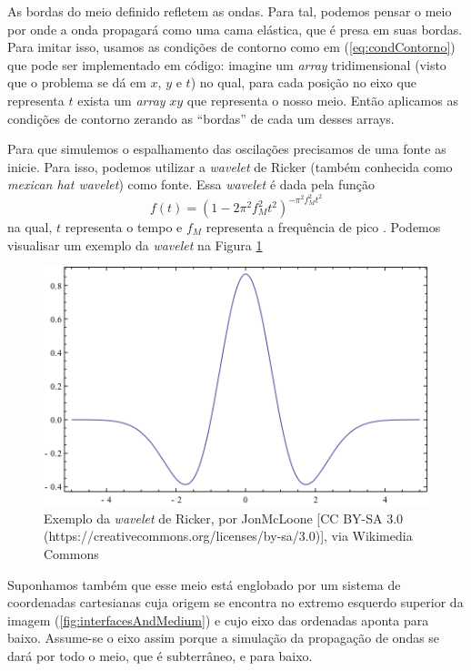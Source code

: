             As bordas do meio definido refletem as ondas. Para tal, podemos pensar o meio por onde a onda propagará como uma
            cama elástica, que é presa em suas bordas. Para imitar isso, usamos as condições de contorno como em (\ref{eq:condContorno})
            que pode ser implementado em código: imagine um \textit{array} tridimensional (visto que o problema se dá em $x$, $y$ e $t$)
            no qual, para cada posição no eixo que representa $t$ exista um \textit{array} $xy$ que representa o nosso meio. Então aplicamos as
            condições de contorno zerando as ``bordas'' de cada um desses arrays.
            
            Para que simulemos o espalhamento das oscilações precisamos de uma fonte as inicie. Para isso, podemos utilizar a \textit{wavelet} 
            de Ricker (também conhecida como \textit{mexican hat wavelet}) como fonte. Essa \textit{wavelet} é dada pela função
            \begin{equation}
                \label{eq:rickerWavelet}
                f(t) = (1 - 2\pi^2f_M^2t^2)^{-\pi^2f_M^2t^2}
            \end{equation}
            na qual, $t$ representa o tempo e $f_M$ representa a frequência de pico \cite{rickerWLet}. Podemos visualisar um exemplo da \textit{wavelet} na Figura \ref{fig:Ricker}
            \begin{figure}[H]
                \centering
                \includegraphics[scale=.6]{imagens/MexicanHatMathematica.png}
                \caption{Exemplo da \textit{wavelet} de Ricker, por JonMcLoone [CC BY-SA 3.0 (https://creativecommons.org/licenses/by-sa/3.0)], via Wikimedia Commons}
                \label{fig:Ricker}
            \end{figure}
            
            Suponhamos também que esse meio está englobado por um sistema de coordenadas cartesianas cuja origem se encontra
            no extremo esquerdo superior da imagem (\ref{fig:interfacesAndMedium}) e cujo eixo das ordenadas aponta para baixo. 
            Assume-se o eixo assim porque a simulação da propagação de ondas se dará por todo o meio, que é subterrâneo, e para 
            baixo.
	        
